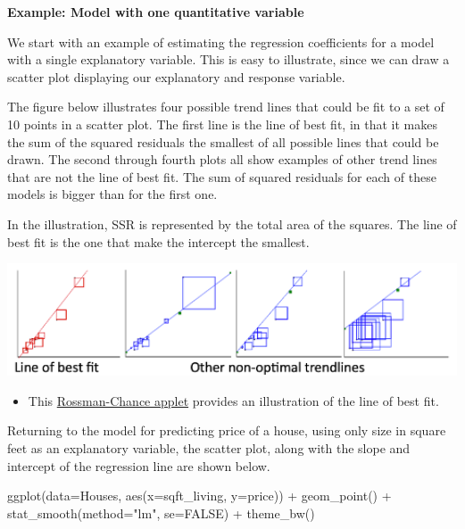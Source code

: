 \documentclass[
  letterpaper,
  DIV=11,
  numbers=noendperiod]{scrreprt}
\newenvironment{Shaded}{\begin{snugshade}}{\end{snugshade}}
\newcommand{\AttributeTok}[1]{\textcolor[rgb]{0.40,0.45,0.13}{#1}}
\newcommand{\ConstantTok}[1]{\textcolor[rgb]{0.56,0.35,0.01}{#1}}
\newcommand{\FunctionTok}[1]{\textcolor[rgb]{0.28,0.35,0.67}{#1}}
\newcommand{\NormalTok}[1]{\textcolor[rgb]{0.00,0.23,0.31}{#1}}
\newcommand{\SpecialCharTok}[1]{\textcolor[rgb]{0.37,0.37,0.37}{#1}}
\newcommand{\StringTok}[1]{\textcolor[rgb]{0.13,0.47,0.30}{#1}}
\providecommand{\tightlist}{%
  \setlength{\itemsep}{0pt}\setlength{\parskip}{0pt}}\usepackage{longtable,booktabs,array}
\begin{document}
\textbf{Example: Model with one quantitative variable}

We start with an example of estimating the regression coefficients for a
model with a single explanatory variable. This is easy to illustrate,
since we can draw a scatter plot displaying our explanatory and response
variable.

The figure below illustrates four possible trend lines that could be fit
to a set of 10 points in a scatter plot. The first line is the line of
best fit, in that it makes the sum of the squared residuals the smallest
of all possible lines that could be drawn. The second through fourth
plots all show examples of other trend lines that are not the line of
best fit. The sum of squared residuals for each of these models is
bigger than for the first one.

In the illustration, SSR is represented by the total area of the
squares. The line of best fit is the one that make the intercept the
smallest.

\includegraphics[width=1\textwidth,height=\textheight]{LSE.png}

\begin{itemize}
\tightlist
\item
  This
  \href{http://www.rossmanchance.com/applets/RegShuffle.htm}{Rossman-Chance
  applet} provides an illustration of the line of best fit.
\end{itemize}

Returning to the model for predicting price of a house, using only size
in square feet as an explanatory variable, the scatter plot, along with
the slope and intercept of the regression line are shown below.

\begin{Shaded}
\begin{Highlighting}[]
\FunctionTok{ggplot}\NormalTok{(}\AttributeTok{data=}\NormalTok{Houses, }\FunctionTok{aes}\NormalTok{(}\AttributeTok{x=}\NormalTok{sqft\_living, }\AttributeTok{y=}\NormalTok{price)) }\SpecialCharTok{+} \FunctionTok{geom\_point}\NormalTok{() }\SpecialCharTok{+} 
  \FunctionTok{stat\_smooth}\NormalTok{(}\AttributeTok{method=}\StringTok{"lm"}\NormalTok{, }\AttributeTok{se=}\ConstantTok{FALSE}\NormalTok{) }\SpecialCharTok{+} \FunctionTok{theme\_bw}\NormalTok{()}
\end{Highlighting}
\end{Shaded}
\end{document}
